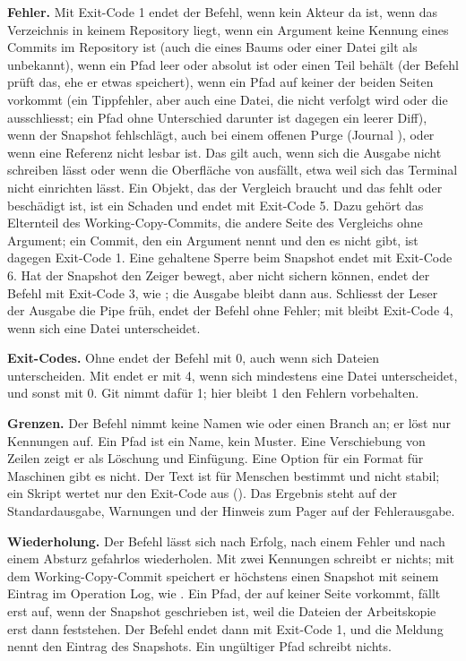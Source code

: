 {\bf Fehler.} Mit Exit-Code 1 endet der Befehl, wenn kein Akteur da ist, wenn das Verzeichnis
in keinem Repository liegt, wenn ein Argument keine Kennung eines Commits im Repository ist
(auch die eines Baums oder einer Datei gilt als unbekannt),
wenn ein Pfad leer oder absolut ist oder einen Teil  behält (der Befehl prüft das,
ehe er etwas speichert), wenn ein Pfad auf keiner der beiden Seiten vorkommt
(ein Tippfehler, aber auch eine Datei, die nicht verfolgt wird oder die 
ausschliesst; ein Pfad ohne Unterschied darunter ist dagegen ein leerer Diff),
wenn der Snapshot fehlschlägt, auch bei einem offenen Purge (Journal ),
oder wenn eine Referenz nicht lesbar ist.
Das gilt auch, wenn sich die Ausgabe nicht schreiben lässt oder wenn die Oberfläche
von  ausfällt, etwa weil sich das Terminal nicht einrichten lässt.
Ein Objekt, das der Vergleich braucht und das fehlt oder beschädigt ist, ist ein Schaden
und endet mit Exit-Code 5. Dazu gehört das Elternteil des Working-Copy-Commits, die andere Seite
des Vergleichs ohne Argument; ein Commit, den ein Argument nennt und den es nicht gibt,
ist dagegen Exit-Code 1. Eine gehaltene Sperre beim Snapshot endet mit Exit-Code 6.
Hat der Snapshot den Zeiger bewegt, aber nicht sichern können, endet der Befehl mit
Exit-Code 3, wie ; die Ausgabe bleibt dann aus.
Schliesst der Leser der Ausgabe die Pipe früh, endet der Befehl ohne Fehler; mit
 bleibt Exit-Code 4, wenn sich eine Datei unterscheidet.

{\bf Exit-Codes.} Ohne  endet der Befehl mit 0, auch wenn sich Dateien
unterscheiden. Mit  endet er mit 4, wenn sich mindestens eine Datei
unterscheidet, und sonst mit 0. Git nimmt dafür 1; hier bleibt 1 den Fehlern vorbehalten.

{\bf Grenzen.} Der Befehl nimmt keine Namen wie  oder einen
Branch an; er löst nur Kennungen auf. Ein Pfad ist ein Name, kein Muster.
Eine Verschiebung von Zeilen zeigt er als Löschung und Einfügung.
Eine Option für ein Format für Maschinen gibt es nicht. Der Text ist für Menschen bestimmt
und nicht stabil; ein Skript wertet nur den Exit-Code aus (). Das Ergebnis
steht auf der Standardausgabe, Warnungen und der Hinweis zum Pager auf der Fehlerausgabe.

{\bf Wiederholung.} Der Befehl lässt sich nach Erfolg, nach einem Fehler und nach einem Absturz
gefahrlos wiederholen. Mit zwei Kennungen schreibt er nichts; mit dem Working-Copy-Commit
speichert er höchstens einen Snapshot mit seinem Eintrag im Operation Log, wie .
Ein Pfad, der auf keiner Seite vorkommt,
fällt erst auf, wenn der Snapshot geschrieben ist, weil die Dateien der Arbeitskopie erst
dann feststehen. Der Befehl endet dann mit Exit-Code 1, und die Meldung nennt den Eintrag
des Snapshots. Ein ungültiger Pfad schreibt nichts.

